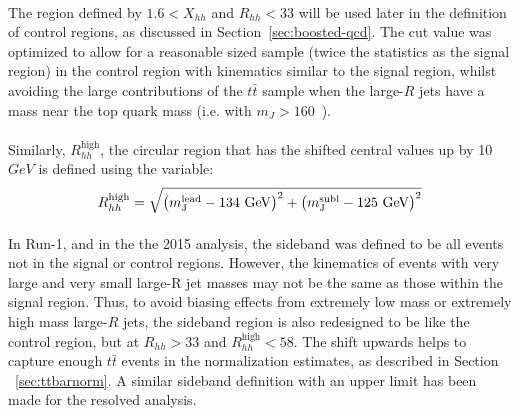 \paragraph{}
The region defined by $1.6 < X_{hh}$ and $R_{hh} < 33$ will be used later in the definition of control regions, as discussed in Section~\ref{sec:boosted-qcd}. The cut value was optimized to allow for a reasonable sized sample (twice the statistics as the signal region) in the control region with kinematics similar to the signal region, whilst avoiding the large contributions of the $t\bar{t}$ sample when the large-$R$ jets have a mass near the top quark mass (i.e. with $m_J > 160$~\GeV).

\paragraph{}
Similarly, $R_{hh}^{\text{high}}$, the circular region that has the shifted central values up by 10 $GeV$ is defined using the variable:\begin{equation}
\label{eq:boosted_RhhhighDef}
R_{hh}^{\text{high}} = \sqrt{\left(m^{\rm lead}_{\rm J} - \text{134 GeV}\right)^2 + \left(m^{\rm subl}_{\rm J} - \text{125 GeV}\right)^2}\\
\end{equation}

\paragraph{}
In Run-1, and in the the 2015 analysis, the sideband was defined to be all events not in the signal or control regions. However, the kinematics of events with very large and very small large-R jet masses may not be the same as those within the signal region. Thus, to avoid biasing effects from extremely low mass or extremely high mass large-$R$ jets, the sideband region is also redesigned to be like the control region, but at $R_{hh} > 33$ and $R_{hh}^{\text{high}} < 58$. The shift upwards helps to capture enough $t\bar{t}$ events in the normalization estimates, as described in Section ~\ref{sec:ttbarnorm}. A similar sideband definition with an upper limit has been made for the resolved analysis.

